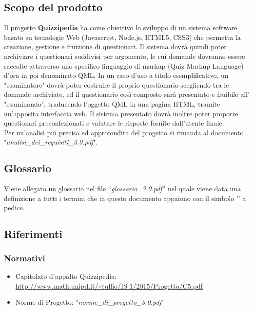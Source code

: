 \documentclass[a4paper,11pt]{article}
\begin{document}
	
	\subsection{Scopo del prodotto}
	Il progetto \textbf{Quizzipedia} ha come obiettivo lo sviluppo di un sistema software basato su tecnologie Web (Javascript\addglos, Node.js\addglos, HTML5\addglos, CSS3\addglos) che permetta la creazione, gestione e fruizione di questionari. Il sistema dovrà quindi poter archiviare i questionari suddivisi per argomento, le cui domande dovranno essere raccolte attraverso uno specifico linguaggio di markup (Quiz Markup Language) d'ora in poi denominato QML\addglos. In un caso d'uso a titolo esemplificativo, un "esaminatore" dovrà poter costruire il proprio questionario scegliendo tra le domande archiviate, ed il questionario così composto sarà presentato e fruibile all' "esaminando", traducendo l'oggetto QML in una pagina HTML\addglos, tramite un'apposita interfaccia web. Il sistema presentato dovrà inoltre poter proporre questionari preconfezionati e valutare le risposte fornite dall'utente finale.
	\\
	Per un'analisi più precisa ed approfondita del progetto si rimanda al documento\\ "\textit{analisi\_dei\_requisiti\_3.0.pdf}".
	\subsection{Glossario}
	Viene allegato un glossario nel file ``\textit{glossario\_3.0.pdf}'' nel quale viene data una definizione a tutti i termini che in questo documento appaiono con il simbolo '\addglos' a pedice.
	\newpage
	\subsection{Riferimenti}
		\subsubsection{Normativi}
		\begin{itemize}
			\item Capitolato d'appalto Quizzipedia:\\
			\url{http://www.math.unipd.it/~tullio/IS-1/2015/Progetto/C5.pdf}
			\item Norme di Progetto: "\textit{norme\_di\_progetto\_3.0.pdf}"
		\end{itemize}
\end{document}
